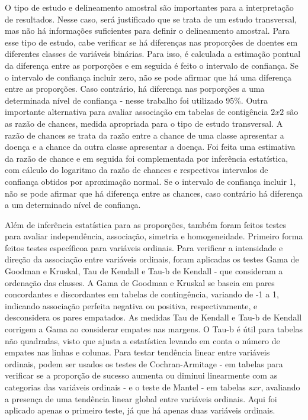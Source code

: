 \documentclass[
]{article}
\begin{document}
O tipo de estudo e delineamento amostral são importantes para a
interpretação de resultados. Nesse caso, será justificado que se trata
de um estudo transversal, mas não há informações suficientes para
definir o delineamento amostral. Para esse tipo de estudo, cabe
verificar se há diferenças nas proporções de doentes em diferentes
classes de variáveis binárias. Para isso, é calculada a estimação
pontual da diferença entre as porporções e em seguida é feito o
intervalo de confiança. Se o intervalo de confiança incluir zero, não se
pode afirmar que há uma diferença entre as proporções. Caso contrário,
há diferença nas porporções a uma determinada nível de confiança - nesse
trabalho foi utilizado 95\%. Outra importante alternativa para avaliar
associação em tabelas de contigência \(2x2\) são as razão de chances,
medida apropriada para o tipo de estudo transversal. A razão de chances
se trata da razão entre a chance de uma classe apresentar a doença e a
chance da outra classe apresentar a doença. Foi feita uma estimativa da
razão de chance e em seguida foi complementada por inferência
estatística, com cálculo do logaritmo da razão de chances e respectivos
intervalos de confiança obtidos por aproximação normal. Se o intervalo
de confiança incluir 1, não se pode afirmar que há diferença entre as
chances, caso contrário há diferença a um determinado nível de
confiança.

Além de inferência estatística para as proporções, também foram feitos
testes para avaliar independência, associação, simetria e homogeneidade.
Primeiro forma feitos testes específicoa para variáveis ordinais. Para
verificar a intensidade e direção da associação entre variáveis
ordinais, foram aplicadas os testes Gama de Goodman e Kruskal, Tau de
Kendall e Tau-b de Kendall - que consideram a ordenação das classes. A
Gama de Goodman e Kruskal se baseia em pares concordantes e discordantes
em tabelas de contingência, variando de -1 a 1, indicando associação
perfeita negativa ou positiva, respectivamente, e desconsidera os pares
empatados. As medidas Tau de Kendall e Tau-b de Kendall corrigem a Gama
ao considerar empates nas margens. O Tau-b é útil para tabelas não
quadradas, visto que ajusta a estatística levando em conta o número de
empates nas linhas e colunas. Para testar tendência linear entre
variáveis ordinais, podem ser usados os testes de Cochran-Armitage - em
tabelas para verificar se a proporção de sucesso aumenta ou diminui
linearmente com as categorias das variáveis ordinais - e o teste de
Mantel - em tabelas \(sxr\), avaliando a presença de uma tendência
linear global entre variáveis ordinais. Aqui foi aplicado apenas o
primeiro teste, já que há apenas duas variáveis ordinais.
\end{document}
